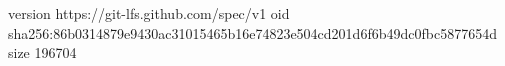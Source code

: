 version https://git-lfs.github.com/spec/v1
oid sha256:86b0314879e9430ac31015465b16e74823e504cd201d6f6b49dc0fbc5877654d
size 196704
